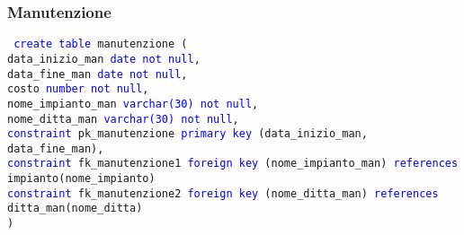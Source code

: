 \documentclass{article}
\begin{document}
    \subsubsection{Manutenzione}
    \begin{flushleft}
        \texttt{
        \textcolor{blue}{create table} manutenzione ( \\
        \hspace*{2em} data\_inizio\_man \hspace*{3.4em} \textcolor{blue}{date} \hspace*{7.4em} \textcolor{blue}{not null}, \\
        \hspace*{2em} data\_fine\_man \hspace*{4.4em} \textcolor{blue}{date} \hspace*{7.4em} \textcolor{blue}{not null}, \\
        \hspace*{2em} costo\hspace*{8.6em} \textcolor{blue}{number} \hspace*{6.4em} \textcolor{blue}{not null}, \\
        \hspace*{2em} nome\_impianto\_man \hspace*{2.4em} \textcolor{blue}{varchar(30)} \hspace*{4em} \textcolor{blue}{not null}, \\
        \hspace*{2em} nome\_ditta\_man \hspace*{3.9em} \textcolor{blue}{varchar(30)} \hspace*{4em} \textcolor{blue}{not null}, \\
        \hspace*{2em} \textcolor{blue}{constraint} pk\_manutenzione \textcolor{blue}{primary key} (data\_inizio\_man, data\_fine\_man), \\
        \hspace*{2em} \textcolor{blue}{constraint} fk\_manutenzione1 \textcolor{blue}{foreign key} (nome\_impianto\_man) \textcolor{blue}{references} \hspace*{2em} impianto(nome\_impianto) \\
        \hspace*{2em} \textcolor{blue}{constraint} fk\_manutenzione2 \textcolor{blue}{foreign key} (nome\_ditta\_man) \textcolor{blue}{references} \hspace*{2em} ditta\_man(nome\_ditta) \\)}
    \end{flushleft}
\end{document}
